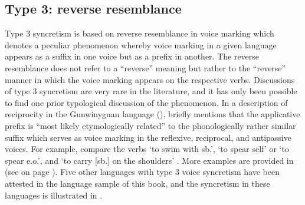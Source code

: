 \subsection{Type 3: reverse resemblance} \label{resemblance-type3}
Type 3 syncretism is based on reverse resemblance in voice marking which denotes a peculiar phenomenon whereby voice marking in a given language appears as a suffix in one voice but as a prefix in another. The reverse resemblance does not refer to a “reverse” meaning but rather to the “reverse” manner in which the voice marking appears on the respective verbs. Discussions of type 3 syncretism are very rare in the literature, and it has only been possible to find one prior typological discussion of the phenomenon. In a description of reciprocity in the Gunwinyguan language  (), \citet[252]{nedjalkov:2007d} briefly mentions that the applicative prefix  is “most likely etymologically related” to the phonologically rather similar suffix  which serves as voice marking in the reflexive, reciprocal, and antipassive voices. For example, compare the verbs  ‘to swim with sb.’,  ‘to spear self’ or ‘to spear e.o.’, and  ‘to carry [sb.] on the shoulders’ \citep[382, 392]{heath:1984}. More examples are provided in  (see  on page \pageref{tab:ch5:antp-refl-recp}). Five other languages with type 3 voice syncretism have been attested in the language sample of this book, and the syncretism in these languages is illustrated in .

